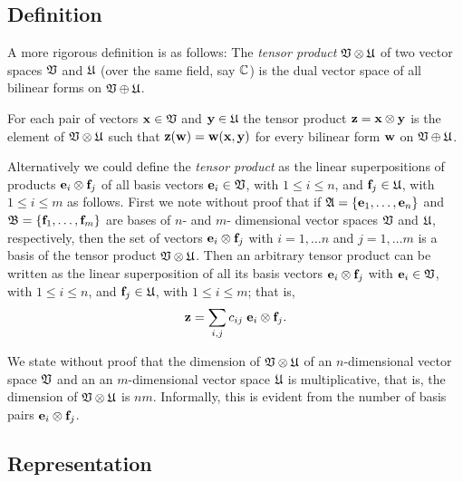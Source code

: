 \subsection{Definition}
A more rigorous definition is as follows:
The {\em tensor product} ${\frak V} \otimes {\frak U}$ of two vector spaces ${\frak V}$
and
${\frak U}$ (over the same field, say ${\Bbb C}$)
is the dual vector space of all bilinear forms on ${\frak V} \oplus {\frak U}$.

For each pair of vectors ${\bf x} \in  {\frak V}$
and
${\bf y} \in  {\frak U}$   the tensor product ${\bf z} = {\bf x} \otimes {\bf y}$
is the element of ${\frak V} \otimes {\frak U}$
such that ${\bf z}({\bf w})={\bf w}({\bf x},{\bf y})$ for every bilinear form
${\bf w}$ on ${\frak V} \oplus {\frak U}$.

Alternatively we could define the {\em tensor product}  as the linear superpositions of products ${\bf e}_i \otimes {\bf f}_j$
of all basis vectors
${\bf e}_i \in  {\frak V}$, with $1\le i \le n$,
and
${\bf f}_j \in  {\frak U}$, with $1\le i \le m$ as follows.
First we note without proof that if ${\frak A} =\{{\bf e}_1,\ldots , {\bf e}_n\}$ and
${\frak B} =\{{\bf f}_1,\ldots , {\bf f}_m\}$
are bases of  $n$- and $m$-
dimensional vector spaces ${\frak V}$ and  ${\frak U}$, respectively,
then the set
of vectors ${\bf e}_i \otimes {\bf f}_j$
with $i=1,\ldots n$ and $j=1,\ldots m$
 is a basis of the { tensor product}
 ${\frak V} \otimes {\frak U}$.
Then an arbitrary tensor product can be written as the linear superposition of all
its basis vectors ${\bf e}_i \otimes {\bf f}_j$
with
${\bf e}_i \in  {\frak V}$, with $1\le i \le n$,
and
${\bf f}_j \in  {\frak U}$, with $1\le i \le m$; that is,
\begin{equation}
{\bf z}=\sum_{i,j} c_{ij} \; {\bf e}_i \otimes {\bf f}_j.
\label{2014-m-ch-fdvs-lsqv}
\end{equation}

We state without proof that the dimension
of ${\frak V} \otimes {\frak U}$ of an $n$-dimensional vector space ${\frak V}$
and  an  an $m$-dimensional vector space
${\frak U}$
is multiplicative,
that is, the dimension of  ${\frak V} \otimes {\frak U}$ is $nm$.
Informally, this is evident from the number of basis pairs ${\bf e}_i \otimes {\bf f}_j$.

\subsection{Representation}

